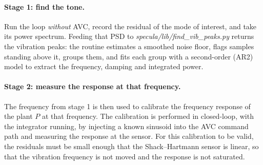 \documentclass[11pt]{article}
\newcommand{\SI}[2]{#1\,#2}
\begin{document}
\paragraph{Stage 1: find the tone.}
Run the loop \emph{without} AVC, record the residual of the mode of interest, and take its power spectrum.
%
Feeding that PSD to \textit{specula/lib/find\_vib\_peaks.py} returns the vibration peaks: the routine estimates a smoothed noise floor, flags samples standing above it, groups them, and fits each group with a second-order (AR2) model to extract the frequency, damping and integrated power.
%
%

\paragraph{Stage 2: measure the response at that frequency.}
The frequency from stage 1 is then used to calibrate the frequency response of the plant $P$ at that frequency. The calibration is performed in closed-loop, with the integrator running, by injecting a known sinusoid into the AVC command path and measuring the response at the sensor.
%
%
%
For this calibration to be valid, the residuals must be small enough that the Shack--Hartmann sensor is linear, so that the vibration frequency is not moved and the response is not saturated.
\end{document}
